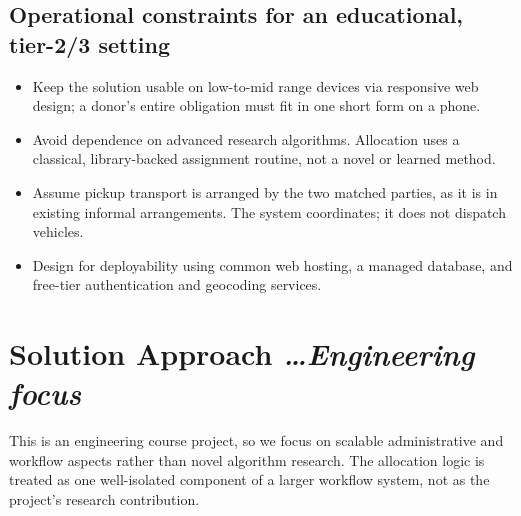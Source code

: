 \documentclass[11pt,a4paper]{article}
\newcommand{\BvrHint}[1]{%
  {\normalfont\normalsize\itshape\hfill #1}}
\begin{document}
\subsection{Operational constraints for an educational, tier-2/3 setting}
\begin{itemize}[leftmargin=0.7cm]
    \item Keep the solution usable on low-to-mid range devices via responsive web design; a donor's entire obligation must fit in one short form on a phone.
    \item Avoid dependence on advanced research algorithms. Allocation uses a classical, library-backed assignment routine, not a novel or learned method.
    \item Assume pickup transport is arranged by the two matched parties, as it is in existing informal arrangements. The system coordinates; it does not dispatch vehicles.
    \item Design for deployability using common web hosting, a managed database, and free-tier authentication and geocoding services.
\end{itemize}

\section{Solution Approach %
\BvrHint{\ldots Engineering focus}}
This is an engineering course project, so we focus on scalable administrative and workflow aspects rather than novel algorithm research. The allocation logic is treated as one well-isolated component of a larger workflow system, not as the project's research contribution.
\end{document}
